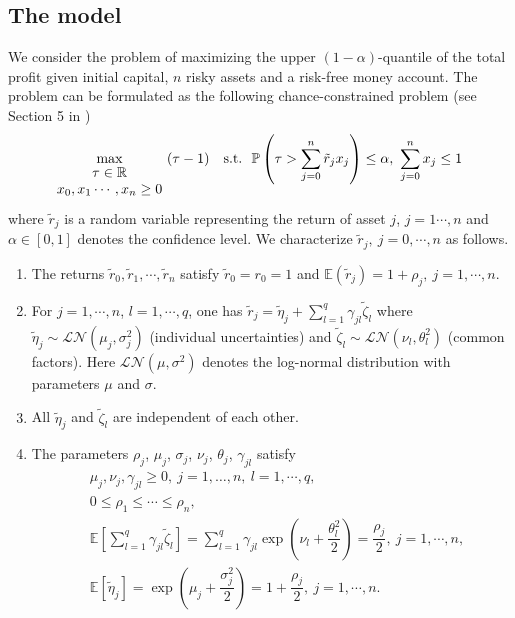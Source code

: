 \documentclass[10pt]{article}
\theoremstyle{definition}
\theoremstyle{plain}
\begin{document}
\subsection{The model} \label{the_model_description}
We consider the problem of maximizing the upper $(1-\alpha)$-quantile of the total profit given initial capital, $n$ risky assets and a risk-free money account. The problem can be formulated as the following chance-constrained problem (see Section 5 in \cite{Nemirovsky_and_Shapiro})
\begin{align} \label{investment_problem}
\max_{\begin{matrix}
	\tau \in \mathbb{R}\\ 	
	x_0, x_1\cdots,x_n \geq 0
	\end{matrix}}\ (\tau - 1)\ \ \ \textnormal{s.t.}\ \ \mathbb{P} \left(\tau > \sum_{j=0}^n \tilde r_j x_j \right) \leq \alpha,\ \sum_{j=0}^{n} x_j \leq 1
\end{align}
where $\tilde{r}_j$ is a random variable representing the return of asset $j$, $j=1\cdots,n$ and $\alpha \in [0,1]$ denotes the confidence level. We characterize $\tilde{r}_j,\ j=0,\cdots,n$ as follows.
\begin{enumerate}
	\item The returns $\tilde r_0, \tilde r_1, \cdots, \tilde r_n$ satisfy $\tilde r_0=r_0=1$ and $\mathbb{E}(\tilde r_j) = 1 + \rho_j,\ j=1,\cdots,n$.
	
	\item For $j=1,\cdots,n$,  $l=1,\cdots,q$, one has $\tilde r_j = \tilde\eta_j + \sum_{l=1}^q \gamma_{jl}\tilde\zeta_l$ where $\tilde\eta_j \sim \mathcal{LN}(\mu_j, \sigma_j^2)$ (individual uncertainties) and $\tilde\zeta_l \sim \mathcal{LN}(\nu_l, \theta_l^2)$ (common factors). Here $\mathcal{LN}(\mu,\sigma^2)$ denotes the log-normal distribution with parameters $\mu$ and $\sigma$. 

	\item All $\tilde\eta_j$ and $\tilde\zeta_l$ are independent of each other.
	
	\item The parameters $\rho_j$, $\mu_j$, $\sigma_j$, $\nu_j$, $\theta_j$, $\gamma_{jl}$ satisfy
	\begin{align*}
	&\mu_j, \nu_j, \gamma_{jl} \geq 0,\ j=1,\dots,n,\ l=1,\cdots,q, \\[1ex]
	&0\leq \rho_1 \leq \cdots \leq \rho_n,\\[1ex]
	&\mathbb{E}\left[\sum_{l=1}^q \gamma_{jl} \tilde\zeta_l\right] =  \sum_{l=1}^q \gamma_{jl} \exp \left(\nu_l + \dfrac{\theta_l^2}{2}\right) = \dfrac{\rho_j}{2},\ j = 1, \cdots, n,\\[1ex]
	&\mathbb{E}\left[\tilde\eta_j\right] = \exp\left(\mu_j + \dfrac{\sigma_j^2}{2}\right) = 1 + \dfrac{\rho_j}{2},\ j =1,\cdots, n.
	\end{align*}
\end{enumerate}
\end{document}

